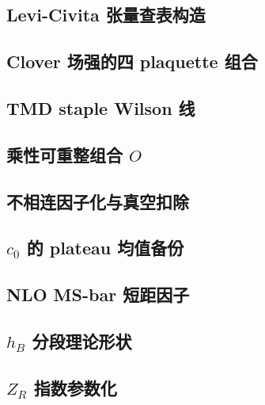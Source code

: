 \documentclass[UTF8]{ctexart}
\begin{document}
\subsection{Levi-Civita 张量查表构造}


\subsection{Clover 场强的四 plaquette 组合}


\subsection{TMD staple Wilson 线}


\subsection{乘性可重整组合 $O$}


\subsection{不相连因子化与真空扣除}


\subsection{$c_0$ 的 plateau 均值备份}


\subsection{NLO MS-bar 短距因子}


\subsection{$h_B$ 分段理论形状}


\subsection{$Z_R$ 指数参数化}

\end{document}
